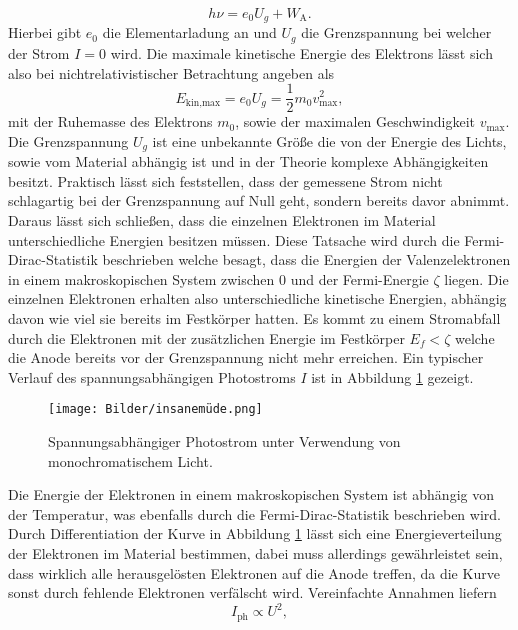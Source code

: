 \begin{equation}
    \label{eq:imp}
    h \nu = e_{0} U_{g} + W_{\text{A}}.
\end{equation}
Hierbei gibt $e_{0}$ die Elementarladung an und $U_{g}$ die Grenzspannung bei welcher der Strom $I = 0$ wird. Die maximale kinetische Energie des Elektrons lässt sich also bei nichtrelativistischer Betrachtung angeben als
\begin{equation*}
    E_{\text{kin,max}} = e_{0} U_{g} = \frac{1}{2} m_{0} v_{\text{max}}^2,
\end{equation*}
mit der Ruhemasse des Elektrons $m_{0}$, sowie der maximalen Geschwindigkeit $v_{\text{max}}$.
Die Grenzspannung $U_{g}$ ist eine unbekannte Größe die von der Energie des Lichts, sowie vom Material abhängig ist und in der Theorie komplexe Abhängigkeiten besitzt. Praktisch lässt sich feststellen, dass der gemessene Strom nicht schlagartig bei der 
Grenzspannung auf Null geht, sondern bereits davor abnimmt. Daraus lässt sich schließen, dass die einzelnen Elektronen im Material unterschiedliche Energien besitzen müssen. Diese Tatsache wird durch die Fermi-Dirac-Statistik beschrieben welche besagt,
dass die Energien der Valenzelektronen in einem makroskopischen System zwischen $0$ und der Fermi-Energie $\zeta$ liegen. Die einzelnen Elektronen erhalten also unterschiedliche kinetische Energien, abhängig davon wie viel sie bereits im Festkörper hatten. Es kommt zu einem Stromabfall 
durch die Elektronen mit der zusätzlichen Energie im Festkörper $E_{f} < \zeta$ welche die Anode bereits vor der Grenzspannung nicht mehr erreichen.
Ein typischer Verlauf des spannungsabhängigen Photostroms $I$ ist in Abbildung \ref{fig:fermishit} gezeigt.
\begin{figure}
    \centering
    \texttt{[image: Bilder/insanemüde.png]}
    \caption{Spannungsabhängiger Photostrom unter Verwendung von monochromatischem Licht. \cite{skript}} 
    \label{fig:fermishit}
\end{figure}
Die Energie der Elektronen in einem makroskopischen System ist abhängig von der Temperatur, was ebenfalls durch die Fermi-Dirac-Statistik beschrieben wird. Durch Differentiation der Kurve in Abbildung \ref{fig:fermishit} lässt sich eine 
Energieverteilung der Elektronen im Material bestimmen, dabei muss allerdings gewährleistet sein, dass wirklich alle herausgelösten Elektronen auf die Anode treffen, da die Kurve sonst durch fehlende Elektronen verfälscht wird.
Vereinfachte Annahmen liefern 
\begin{equation}
    \label{eq:whatisthis}
I_{\text{ph}} \propto U^2,
\end{equation}
